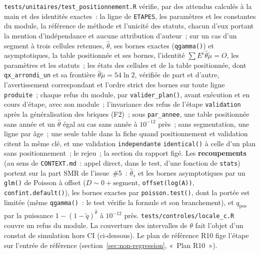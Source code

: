 \documentclass[a4paper,11pt]{article}
\newcommand{\code}[1]{\texttt{\small #1}}
\begin{document}
{\sloppy \code{tests/unitaires/test\_positionnement.R} vérifie, par des
attendus calculés à la main et des identités exactes~: la ligne de
\code{ETAPES}, les paramètres et les constantes du module, la référence de
méthode et l'unicité des statuts, chacun d'eux portant la mention
d'indépendance et aucune attribution d'auteur~; sur un cas d'un segment à
trois cellules retenues, $\hat\theta$, ses bornes exactes
(\code{qgamma()}) et asymptotiques, la table positionnée et ses bornes,
l'identité $\sum E^c \hat\theta \tilde\mu = O$, les paramètres et les
statuts~; les états des cellules et de la table positionnée, dont
\code{qx\_arrondi\_un} et sa frontière $\hat\theta\tilde\mu = 54 \ln 2$,
vérifiée de part et d'autre, l'avertissement correspondant et l'ordre
strict des bornes sur toute ligne \code{produite}~; chaque refus du module,
par \code{valider\_plan()}, avant exécution et en cours d'étape, avec son
module~; l'invariance des refus de l'étape \code{validation} après la
généralisation des briques (F2)~; sous \code{par\_annee}, une table
positionnée sans année et un $\hat\theta$ égal au cas sans année à
$10^{-12}$ près~; sans segmentation, une ligne par âge~; une seule table
dans la fiche quand positionnement et validation citent la même clé, et
une validation \code{independante} \code{identical()} à celle d'un plan
sans positionnement~; le rejeu~; la section du rapport figé. Les
\textbf{recoupements} (au sens de \code{CONTEXT.md}~: appel direct, dans
le test, d'une fonction de \code{stats}) portent sur la part SMR de
l'issue~\#5~: $\hat\theta_s$ et les bornes asymptotiques par un
\code{glm()} de Poisson à offset ($D \sim 0 + \text{segment}$,
\code{offset(log(A))}, \code{confint.default()}), les bornes exactes par
\code{poisson.test()}, dont la portée est limitée (même \code{qgamma()}~:
le test vérifie la formule et son branchement), et $q_{\mathrm{pos}}$ par
la puissance $1 - (1 - \tilde q)^{\hat\theta}$ à $10^{-12}$ près.
\code{tests/controles/locale\_c.R} couvre un refus du module. La
couverture des intervalles de $\theta$ fait l'objet d'un constat de
simulation hors CI (ci-dessous). Le plan de référence R10 fige l'étape sur
l'entrée de référence (section~\ref{sec:non-regression}, «~Plan R10~»).\par}
\end{document}
